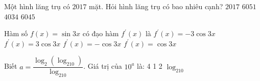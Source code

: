 \begin{ex}%
Một hình lăng trụ có $2017$ mặt. Hỏi hình lăng trụ có bao nhiêu cạnh?
\choice
{$2017$}
{$6051$}
{$4034$}
{\True $6045$}
\end{ex}

\begin{ex}%
Hàm số $f(x)=\sin 3x$ có đạo hàm $f^\prime (x)$ là
\choice
{$f^\prime (x)=-3\cos 3x$}
{\True $f^\prime (x)=3\cos 3x$}
{$f^\prime (x)=-\cos 3x$}
{$f^\prime (x)=\cos 3x$}
\end{ex}

\begin{ex}%
Biết $a=\dfrac{\log _2(\log _210)}{\log _210}$. Giá trị của $10^a$ là:
\choice
{4}
{1}
{2}
{\True $\log _210$}
\end{ex}

